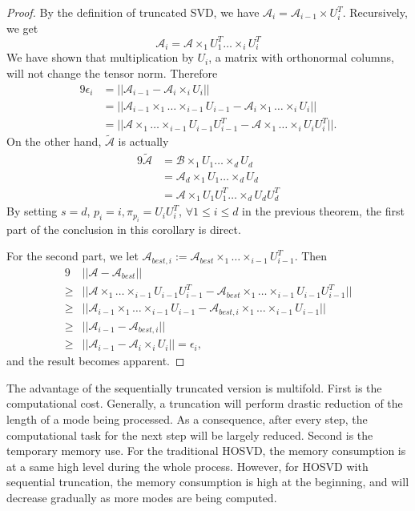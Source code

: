 \documentclass[12pt]{article}
\begin{document}
\begin{proof}
By the definition of truncated SVD, we have $\mathcal{A}_i = \mathcal{A}_{i-1} \times U_i^T$. Recursively, we get
$$ \mathcal{A}_i = \mathcal{A} \times_1 U_1^T  \dots \times_i U_i^T $$
We have shown that multiplication by $U_i$, a matrix with orthonormal columns, will not change the tensor norm. Therefore
\begin{alignat*}{9}
\epsilon_i & = || \mathcal{A}_{i - 1} - \mathcal{A}_i \times_i U_i || \\
&= || \mathcal{A}_{i-1} \times_1 \dots \times_{i-1} U_{i-1} - \mathcal{A}_i \times_1 \dots \times_i U_i || \\
&= || \mathcal{A} \times_1 \dots \times_{i-1} U_{i-1}U_{i-1}^T - \mathcal{A} \times_1 \dots \times_i U_iU_i^T ||.
\end{alignat*}
On the other hand, $\tilde{\mathcal{A}}$ is actually
\begin{alignat*}{9}
 \tilde{\mathcal{A}} &=  \mathcal{B} \times_1 U_1 \dots \times_d U_d \\
& = \mathcal{A}_d \times_1 U_1 \dots \times_d U_d \\
& = \mathcal{A} \times_1 U_1U_1^T \dots \times_d U_dU_d^T
 \end{alignat*}
By setting $s = d$, $p_i = i, \pi_{p_i} = U_iU_i^T$, $\forall 1 \leq i \leq d$ in the previous theorem, the first part of the conclusion in this corollary is direct.

For the second part, we let $\mathcal{A}_{best,i} := \mathcal{A}_{best} \times_1 \dots \times_{i-1} U_{i-1}^T$. Then 
\begin{alignat*}{9}
& || \mathcal{A} - \mathcal{A}_{best} || \\
 \geq & || \mathcal{A} \times_1 \dots \times_{i-1} U_{i-1}U_{i-1}^T - \mathcal{A}_{best} \times_1 \dots \times_{i-1} U_{i-1}U_{i-1}^T || \\
 \geq & || \mathcal{A}_{i-1} \times_1 \dots \times_{i-1} U_{i-1} - \mathcal{A}_{best, i} \times_1 \dots \times_{i-1} U_{i-1} || \\
 \geq & || \mathcal{A}_{i-1} - \mathcal{A}_{best,i} || \\
 \geq & || \mathcal{A}_{i-1} - \mathcal{A}_{i} \times_i U_i || = \epsilon_i,
\end{alignat*}
and the result becomes apparent.
\end{proof}

The advantage of the sequentially truncated version is multifold. First is the computational cost. Generally, a truncation will perform drastic reduction of the length of a mode being processed. As a consequence, after every step, the computational task for the next step will be largely reduced. Second is the temporary memory use. For the traditional HOSVD, the memory consumption is at a same high level during the whole process. However, for HOSVD with sequential truncation, the memory consumption is high at the beginning, and will decrease gradually as more modes are being computed. 
\end{document}
